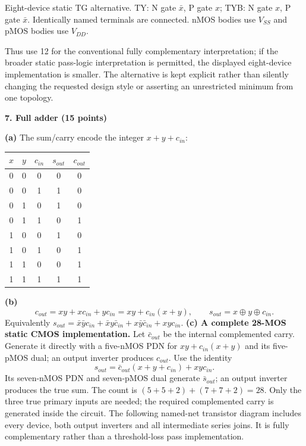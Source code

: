 \documentclass[10pt]{article}
\newcommand{\qheading}[1]{\par\medskip\textbf{#1}\par}
\begin{document}
\small Eight-device static TG alternative. TY: N gate $\bar x$, P gate $x$; TYB: N gate $x$, P gate $\bar x$. Identically named terminals are connected. nMOS bodies use $V_{SS}$ and pMOS bodies use $V_{DD}$.\normalsize\par
Thus use 12 for the conventional fully complementary interpretation; if the broader static pass-logic interpretation is permitted, the displayed eight-device implementation is smaller. The alternative is kept explicit rather than silently changing the requested design style or asserting an unrestricted minimum from one topology.
\newpage
\qheading{7. Full adder (15 points)}
\textbf{(a)} The sum/carry encode the integer $x+y+c_{in}$:
\begin{center}\begin{tabular}{ccccc}\toprule$x$&$y$&$c_{in}$&$s_{out}$&$c_{out}$\\\midrule
0&0&0&0&0\\0&0&1&1&0\\0&1&0&1&0\\0&1&1&0&1\\
1&0&0&1&0\\1&0&1&0&1\\1&1&0&0&1\\1&1&1&1&1\\\bottomrule\end{tabular}\end{center}
\textbf{(b)}
\[\boxed{c_{out}=xy+xc_{in}+yc_{in}=xy+c_{in}(x+y),\qquad s_{out}=x\oplus y\oplus c_{in}.}\]
Equivalently $s_{out}=\bar x\bar yc_{in}+\bar xy\bar c_{in}+x\bar y\bar c_{in}+xyc_{in}$.
\textbf{(c) A complete 28-MOS static CMOS implementation.} Let $\bar c_{out}$ be the internal complemented carry. Generate it directly with a five-nMOS PDN for $xy+c_{in}(x+y)$ and its five-pMOS dual; an output inverter produces $c_{out}$. Use the identity
\[s_{out}=\bar c_{out}(x+y+c_{in})+xyc_{in}.\]
Its seven-nMOS PDN and seven-pMOS dual generate $\bar s_{out}$; an output inverter produces the true sum. The count is $(5+5+2)+(7+7+2)=28$. Only the three true primary inputs are needed; the required complemented carry is generated inside the circuit.
The following named-net transistor diagram includes every device, both output inverters and all intermediate series joins. It is fully complementary rather than a threshold-loss pass implementation.
\newpage
\end{document}
